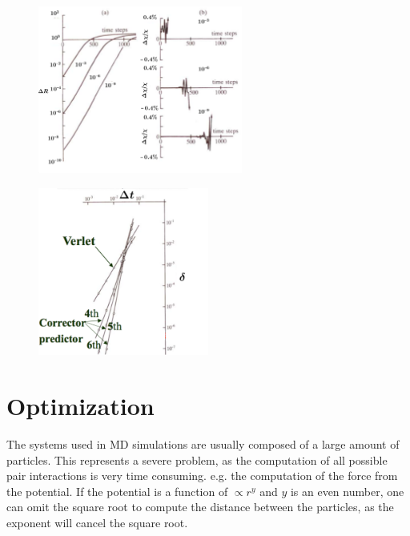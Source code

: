 \begin{figure}[h!]
  \centering
  \includegraphics[width=0.6\textwidth]{pics/divergence_leap}
  \label{fig:divergence_leap}
\end{figure}

\begin{figure}[h!]
  \centering
  \includegraphics[width=0.5\textwidth]{pics/comp_verlet}
  \label{fig:comp_verlet}
\end{figure}



\section{Optimization}

The systems used in MD simulations are usually composed of a large amount of particles. This represents a severe problem, as the computation of all possible pair interactions is very time consuming. e.g. the computation of the force from the potential. If the potential is a function of $\propto r^{y}$ and $y$ is an even number, one can omit the square root to compute the distance between the particles, as the exponent will cancel the square root.

